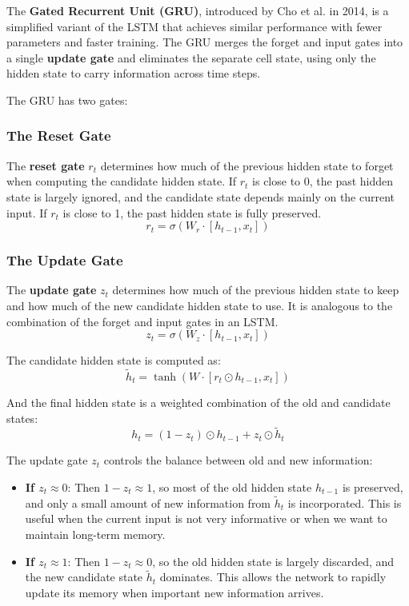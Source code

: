\documentclass[11pt,a4paper]{article}
\begin{document}
The \textbf{Gated Recurrent Unit (GRU)}, introduced by Cho et al. in 2014, is a simplified variant of the LSTM that achieves similar performance with fewer parameters and faster training. The GRU merges the forget and input gates into a single \textbf{update gate} and eliminates the separate cell state, using only the hidden state to carry information across time steps.

The GRU has two gates:

\subsubsection{The Reset Gate}

The \textbf{reset gate} $r_t$ determines how much of the previous hidden state to forget when computing the candidate hidden state. If $r_t$ is close to 0, the past hidden state is largely ignored, and the candidate state depends mainly on the current input. If $r_t$ is close to 1, the past hidden state is fully preserved.
\[
r_t = \sigma(W_r \cdot [h_{t-1}, x_t])
\]

\subsubsection{The Update Gate}

The \textbf{update gate} $z_t$ determines how much of the previous hidden state to keep and how much of the new candidate hidden state to use. It is analogous to the combination of the forget and input gates in an LSTM.
\[
z_t = \sigma(W_z \cdot [h_{t-1}, x_t])
\]

The candidate hidden state is computed as:
\[
\tilde{h}_t = \tanh(W \cdot [r_t \odot h_{t-1}, x_t])
\]

And the final hidden state is a weighted combination of the old and candidate states:
\[
h_t = (1 - z_t) \odot h_{t-1} + z_t \odot \tilde{h}_t
\]

\begin{tcolorbox}[colback=blue!5!white,colframe=blue!75!black,title=\textbf{Key Insight: Interpreting the GRU Update Gate}]
The update gate $z_t$ controls the balance between old and new information:
\begin{itemize}
    \item \textbf{If $z_t \approx 0$}: Then $1 - z_t \approx 1$, so most of the old hidden state $h_{t-1}$ is preserved, and only a small amount of new information from $\tilde{h}_t$ is incorporated. This is useful when the current input is not very informative or when we want to maintain long-term memory.
    \item \textbf{If $z_t \approx 1$}: Then $1 - z_t \approx 0$, so the old hidden state is largely discarded, and the new candidate state $\tilde{h}_t$ dominates. This allows the network to rapidly update its memory when important new information arrives.
\end{itemize}
\end{tcolorbox}
\end{document}
